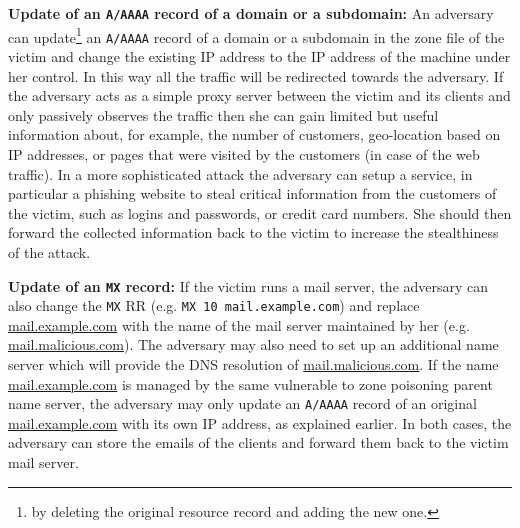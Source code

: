 \textbf{Update of an \texttt{A/AAAA} record of a domain or a subdomain:}
An adversary can update\footnote{by deleting the original resource record and adding the new one.} an \texttt{A/AAAA} record of %
a domain or a subdomain in the zone file of the victim and change the existing IP address to the IP address of the machine under her control. %
In this way all the traffic will be redirected towards the adversary.
If the adversary acts as a simple proxy server between the victim and its clients and only passively observes the traffic then she can gain limited but useful information about, %
for example, the number of customers, geo-location based on IP addresses, or pages that were visited by the customers (in case of the web traffic). 
In a more sophisticated attack the adversary can setup a service, in particular a phishing website to steal %
critical information from the customers of the victim, such as logins and passwords, or credit card numbers. 
She should then forward the collected information back to the %
victim to increase the stealthiness of the attack. 

\textbf{Update of an \texttt{MX} record:} 
If the victim runs a mail server, the adversary can also change the \texttt{MX} RR (e.g. \texttt{MX  10 mail.example.com}) and replace \url{mail.example.com} with the name of the mail server maintained by her (e.g. \url{mail.malicious.com}).
The adversary may also need to set up an additional name server which will provide the DNS resolution of \url{mail.malicious.com}.
If the name \url{mail.example.com} %
is managed by the same vulnerable to zone poisoning parent name server, the adversary may only update an \texttt{A/AAAA} record of an original \url{mail.example.com} with its own IP address, as explained earlier.
In both cases, the adversary can store the emails of the clients and forward them back %
to the victim mail server.

